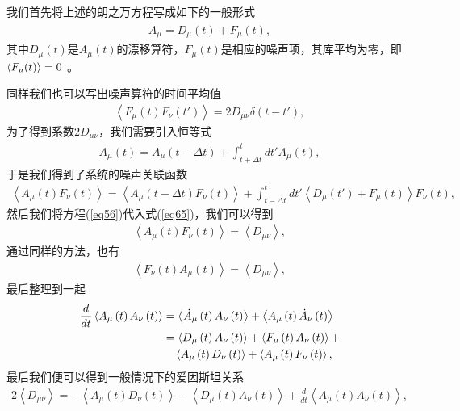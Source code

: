 我们首先将上述的朗之万方程写成如下的一般形式
\begin{align}
{\dot A_\mu } = {D_\mu }(t) + {F_\mu }(t),\label{eq62}
\end{align}
其中$D_\mu(t)$是$A_\mu(t)$的漂移算符，$F_\mu(t)$是相应的噪声项，其库平均为零，即$\braket{F_u(t)}=0$ 。

同样我们也可以写出噪声算符的时间平均值
\begin{align}
\left\langle {{F_\mu }\left( t \right){F_\nu }\left( {t'} \right)} \right\rangle  = 2{D_{\mu \nu }}\delta \left( {t - t'} \right),\label{eq63}
\end{align}
为了得到系数$2D_{\mu\nu}$，我们需要引入恒等式
\begin{align}
{A_\mu }\left( t \right) = {A_\mu }\left( {t - \Delta t} \right) + \int_{t + \Delta t}^t {dt'} {\dot A_\mu }\left( t \right),\label{eq64}
\end{align}
于是我们得到了系统的噪声关联函数
\begin{align}
\left\langle {{A_\mu }\left( t \right){F_\nu }\left( t \right)} \right\rangle  = \left\langle {{A_\mu }\left( {t - \Delta t} \right){F_\nu }\left( t \right)} \right\rangle  + \int_{t - \Delta t}^t {dt'} \left\langle {{D_\mu }\left( {t'} \right) + {F_\mu }\left( t \right)} \right\rangle {F_\nu }\left( t \right),\label{eq65}
\end{align}
然后我们将方程(\ref{eq56})代入式(\ref{eq65})，我们可以得到
\begin{align}
\left\langle {{A_\mu }\left( t \right){F_\nu }(t)} \right\rangle  = \left\langle {{D_{\mu \nu }}} \right\rangle ,\label{eq66}
\end{align}
通过同样的方法，也有
\begin{align}
\left\langle {{F_\nu }(t){A_\mu }\left( t \right)} \right\rangle  = \left\langle {{D_{\mu \nu }}} \right\rangle ,\label{eq67}
\end{align}
最后整理到一起
\begin{align}\label{eq68}
\begin{split}
\frac{d}{{dt}}\left\langle {{A_\mu }\left( t \right){A_\nu }\left( t \right)} \right\rangle  
&= \left\langle {{{\dot A}_\mu }\left( t \right){A_\nu }\left( t \right)} \right\rangle  + \left\langle {{A_\mu }\left( t \right){{\dot A}_\nu }\left( t \right)} \right\rangle \\
& = \left\langle {{D_\mu }\left( t \right){A_\nu }\left( t \right)} \right\rangle  + \left\langle {{F_\mu }\left( t \right){A_\nu }\left( t \right)} \right\rangle {\rm{ + }}\\
&\quad\left\langle {{A_\mu }\left( t \right){D_\nu }\left( t \right)} \right\rangle  + \left\langle {{A_\mu }\left( t \right){F_\nu }\left( t \right)} \right\rangle ,
\end{split}
\end{align}
最后我们便可以得到一般情况下的爱因斯坦关系
\begin{align}
2\left\langle {{D_{\mu \nu }}} \right\rangle  =  - \left\langle {{A_\mu }\left( t \right){D_\nu }\left( t \right)} \right\rangle  - \left\langle {{D_\mu }\left( t \right){A_\nu }\left( t \right)} \right\rangle  + \frac{d}{{dt}}\left\langle {{A_\mu }\left( t \right){A_\nu }\left( t \right)} \right\rangle ,\label{eq69}
\end{align}

